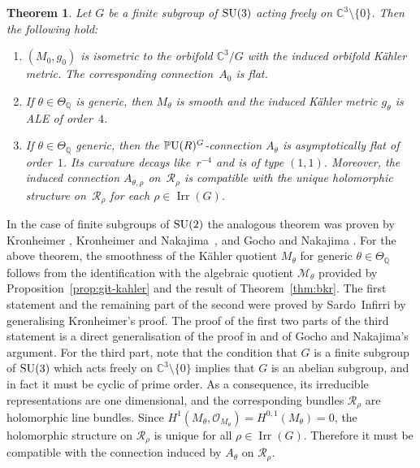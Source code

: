 \documentclass[pdftex]{sigma}
\numberwithin{equation}{section}
\newcommand{\cO}{\mathcal{O}}
\newcommand{\cR}{\mathcal{R}}
\newcommand{\sM}{\mathscr{M}}
\newcommand{\Q}{{\mathbb Q}}
\newcommand{\C}{{\mathbb C}}
\newcommand{\SU}{{\rm SU}}
\newcommand{\PU}{{\mathbb P}{\rm U}}
\newcommand{\Irr}{\operatorname{Irr}}
\newtheorem{Theorem}{Theorem}[section]
\begin{document}
\begin{Theorem}\label{thm:asympt}
  Let $G$ be a finite subgroup of $\SU(3)$ acting freely on
  $\C^3{\setminus} \{0\}$.  Then the following hold:
  \begin{enumerate}\itemsep=0pt
  \item[$(1)$] $(M_0,g_0)$ is isometric to the orbifold $\C^3/G$ with the
    induced orbifold K\"ahler metric. The corresponding connection~$A_0$
    is flat.
  \item[$(2)$] %
   If $\theta \in \Theta_\Q$ is generic,
    then $M_{\theta}$ is smooth and the induced K\"ahler metric
    $g_{\theta}$ is ALE of order~$4$.
  \item[$(3)$] %
  If $\theta\in \Theta_\Q$ generic, then
    the $\PU(R)^G$-connection $A_{\theta}$ is asymptotically flat of
    order~$1$.  Its curvature decays like~$r^{-4}$ and is of type
    $(1,1)$.  Moreover, the induced connection $A_{\theta,\rho}$ on~$\cR_\rho$ is compatible with the unique holomorphic structure on~$\cR_\rho$ for each $\rho \in \Irr(G)$.
  \end{enumerate}
\end{Theorem}

In the case of f\/inite subgroups of $\SU(2)$ the analogous theorem was proven by Kronheimer \cite{Kronheimer1989}, Kronheimer and Nakajima~\cite{Kronheimer1990}, and Gocho and Nakajima \cite{Gocho1992}.
For the above theorem, the smoothness of the K\"ahler quotient $M_{\theta}$ for generic $\theta\in \Theta_{\Q}$ follows from the identif\/ication with the algebraic quotient $\sM_{\theta}$ provided by Proposition~\ref{prop:git-kahler} and the result of Theorem~\ref{thm:bkr}.
The f\/irst statement and the remaining part of the second were proved by Sardo~Inf\/irri \cite{SardoInfirri1996} by generalising Kronheimer's proof.
The proof of the f\/irst two parts of the third statement is a direct generalisation of the proof in \cite[Proposition~2.2]{Kronheimer1990} and of Gocho and Nakajima's argument.
For the third part, note that the condition that $G$ is a f\/inite subgroup of $\SU(3)$ which acts freely on $\C^3{\setminus} \{0\}$ implies that $G$ is an abelian subgroup, and in fact it must be cyclic of prime order.
As a consequence, its irreducible representations are one dimensional, and the corresponding bundles $\cR_{\rho}$ are holomorphic line bundles.
Since $H^1(M_\theta,\cO_{M_\theta})=H^{0,1}(M_\theta)=0$, the holomorphic structure on $\cR_\rho$ is unique for all $\rho \in \Irr(G)$.
Therefore it must be compatible with the connection induced by $A_{\theta}$ on $\cR_{\rho}$.
\end{document}
